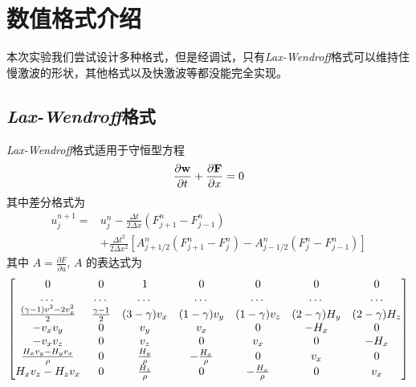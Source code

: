 \documentclass[10.5pt
]{article}
\begin{document}
\section{数值格式介绍}
本次实验我们尝试设计多种格式，但是经调试，只有\textit{Lax-Wendroff}格式可以维持住慢激波的形状，其他格式以及快激波等都没能完全实现。
\subsection{\textit{Lax-Wendroff}格式}
\textit{Lax-Wendroff}格式适用于守恒型方程
\begin{align}
\frac{\partial \vb w}{\partial t} + \frac{\partial \vb F}{\partial x} = 0
\end{align}
其中差分格式为
\begin{align}
u_j^{n+1} =& u_j^n - \frac{\Delta t}{2\Delta x} (F_{j+1}^n - F_{j-1}^n) \nonumber\\
& + \frac{\Delta t^2}{2\Delta x^2} \left[A_{j+1/2}^n (F_{j+1}^n-F_j^n) - A_{j-1/2}^n (F_j^n -
F_{j-1}^n)\right]
\end{align}
其中 $A = \frac{\partial F}{\partial u}$, $A$ 的表达式为
\begin{equation}
   \mqty[
0  &  0  &  1  &  0  &  0  &  0  &  0 \\
\dots  &  \dots  &  \dots  &  \dots  &  \dots  &  \dots  &  \dots \\
\frac{(\gamma-1) v^2-2v_x^2}{2 }  &  \frac{\gamma-1}{2}  &  (3-\gamma) v_x  & (1-\gamma) v_y  &  (1-\gamma) v_z  &  (2-\gamma) H_y  &  (2-\gamma) H_z \\
-v_x v_y  &  0  &  v_y  &  v_x  &  0  &  -H_x  &  0 \\
-v_x v_z  &  0  &  v_z  &  0  &  v_x  &  0  &  -H_x \\
\frac{H_x v_y-H_y v_x}{\rho}  &  0  &  \frac{H_y}{\rho}  &  -\frac{H_x}{\rho}  &  0  &  v_x  &  0 \\
H_x v_z-H_z v_x  &  0  &  \frac{H_z}{\rho}  &  0  &  -\frac{H_x}{\rho}  &  0  &  v_x ]
\end{equation}
\end{document}
